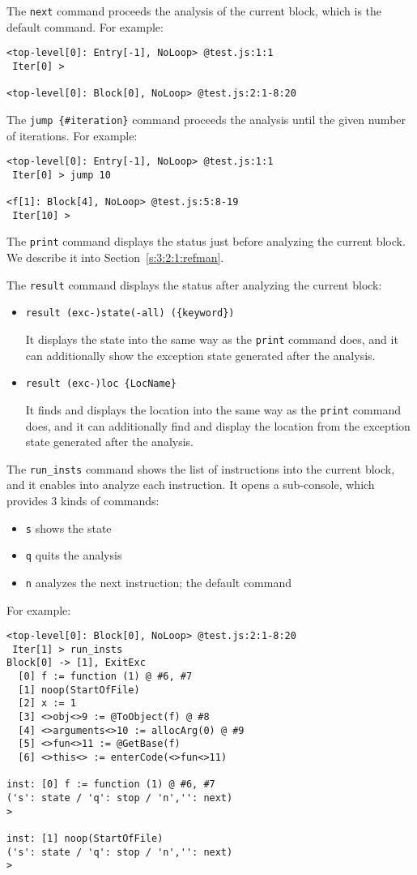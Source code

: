 \medskip
The \verb!next! command proceeds the analysis of the current block,
which is the default command.  For example:
{\small
\begin{verbatim}
<top-level[0]: Entry[-1], NoLoop> @test.js:1:1
 Iter[0] >

<top-level[0]: Block[0], NoLoop> @test.js:2:1-8:20
\end{verbatim}
}

\medskip
The \verb!jump {#iteration}! command proceeds the analysis until the given
number of iterations.  For example:
{\small
\begin{verbatim}
<top-level[0]: Entry[-1], NoLoop> @test.js:1:1
 Iter[0] > jump 10

<f[1]: Block[4], NoLoop> @test.js:5:8-19
 Iter[10] >
\end{verbatim}
}

\medskip
The \verb!print! command displays the status just before
analyzing the current block.  We describe it into Section~\ref{s:3:2:1:refman}.

\medskip
The \verb!result! command displays the status after analyzing
the current block:
\begin{itemize}
\item \verb!result (exc-)state(-all) ({keyword})!

It displays the state into the same way as the \verb!print! command does,
and it can additionally show the exception state generated after the analysis.
\item \verb!result (exc-)loc {LocName}!

It finds and displays the location into the same way as the \verb!print! command does,
and it can additionally find and display the location from
the exception state generated after the analysis.
\end{itemize}

\medskip
The \verb!run_insts! command shows the list of instructions into the current block,
and it enables into analyze each instruction.  It opens a sub-console, which provides 3 kinds
of commands:
\begin{itemize}
\itemsep-.1em
\item \verb!s! shows the state
\item \verb!q! quits the analysis
\item \verb!n! analyzes the next instruction; the default command
\end{itemize}
For example:
{\small
\begin{verbatim}
<top-level[0]: Block[0], NoLoop> @test.js:2:1-8:20
 Iter[1] > run_insts
Block[0] -> [1], ExitExc
  [0] f := function (1) @ #6, #7
  [1] noop(StartOfFile)
  [2] x := 1
  [3] <>obj<>9 := @ToObject(f) @ #8
  [4] <>arguments<>10 := allocArg(0) @ #9
  [5] <>fun<>11 := @GetBase(f)
  [6] <>this<> := enterCode(<>fun<>11)

inst: [0] f := function (1) @ #6, #7
('s': state / 'q': stop / 'n','': next)
>

inst: [1] noop(StartOfFile)
('s': state / 'q': stop / 'n','': next)
>
\end{verbatim}
}

